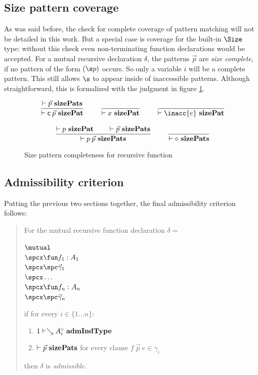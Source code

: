 \subsection{Size pattern coverage}

As was said before, the check for complete coverage of pattern matching will not be detailed in this work. 
But a special case is coverage for the built-in $\Size$ type: without this check even non-terminating function declarations would be accepted. 
For a mutual recursive declaration $\delta$, the patterns $\vec{p}$ are \emph{size complete}, if no pattern of the form $(\s p)$ occurs. So only a variable $i$ will be a complete pattern. This still allows $\s$ to appear inside of inaccessible patterns.
Although straightforward, this is formalized with the judgment in figure \ref{spj}.

\begin{figure}[htp]
\begin{gather*}
\nru{}
{\sizePats{\vec{p}}}
{\sizePat{\cc \: \vec{p}}}
\qquad
\nru{}
{}
{\sizePat{x}}
\qquad
\nru{}
{}
{\sizePat{\inacc{e}}}
\\[2ex]
\nru{}
{\sizePat{p} \qquad \sizePats{\vec{p}}}
{\sizePats{p \: \vec{p}}}
\qquad
\nru{}
{}
{\sizePats{\diamond}}
\end{gather*}
\caption{Size pattern completeness for recursive function}
\label{spj}
\end{figure}


\subsection{Admissibility criterion}
Putting the previous two sections together,
the final admissibility criterion follows:
\begin{quote}
For the mutual recursive function declaration $\delta =$
\begin{bsp}
$\mutual$\\
$\spcx \fun f_1 : A_1 $\\
$\spcx \spc \vec{\gamma}_1$\\
$\spcx \ldots$\\
$\spcx \fun f_n : A_n $\\
$\spcx \spc \vec{\gamma}_n$
\end{bsp}
if  for every $i \in \{1 \ldots n \}$:
\begin{enumerate}
\item
$1\vdash\searrow A_i^{\diamond}\mbox{ \textbf{admIndType}}$
\item
$\vdash\vec{p}\mbox{ \textbf{sizePats}}$ for every clause $f \: \vec{p} \: e \in \gamma_i$
\end{enumerate}
then $\delta$ is \emph{admissible}.
\end{quote}

